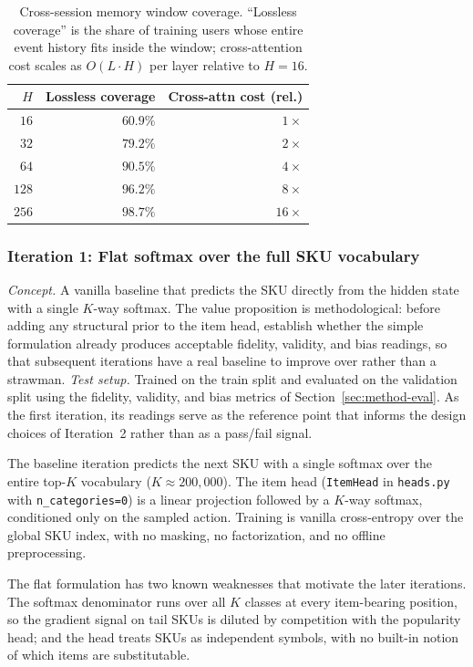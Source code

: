 \documentclass[sigconf,nonacm]{acmart}
\begin{document}
\begin{table}[t]
\caption{Cross-session memory window coverage. ``Lossless coverage''
is the share of training users whose entire event history fits inside
the window; cross-attention cost scales as $O(L \cdot H)$ per layer
relative to $H = 16$.}
\label{tab:history-window-coverage}
\small
\begin{tabular}{@{}r r r@{}}
\toprule
$H$ & Lossless coverage & Cross-attn cost (rel.) \\
\midrule
$16$  & $60.9\%$ & $1\times$  \\
$32$  & $79.2\%$ & $2\times$  \\
$64$  & $90.5\%$ & $4\times$  \\
$128$ & $96.2\%$ & $8\times$  \\
$256$ & $98.7\%$ & $16\times$ \\
\bottomrule
\end{tabular}
\end{table}

\subsubsection{Iteration 1: Flat softmax over the full SKU vocabulary}
\label{sec:iter1-flat}
\textit{Concept.} A vanilla baseline that predicts the SKU directly
from the hidden state with a single $K$-way softmax. The value
proposition is methodological: before adding any structural prior to
the item head, establish whether the simple formulation already
produces acceptable fidelity, validity, and bias readings, so that
subsequent iterations have a real baseline to improve over rather than
a strawman.
\textit{Test setup.} Trained on the train split and evaluated on the
validation split using the fidelity, validity, and bias metrics of
Section~\ref{sec:method-eval}. As the first iteration, its readings
serve as the reference point that informs the design choices of
Iteration~2 rather than as a pass/fail signal.

The baseline iteration predicts the next SKU with a single softmax over the
entire top-$K$ vocabulary ($K \approx 200{,}000$). The item head
(\texttt{ItemHead} in \texttt{heads.py} with \texttt{n\_categories=0}) is a
linear projection followed by a $K$-way softmax, conditioned only on the
sampled action. Training is vanilla cross-entropy over the global SKU
index, with no masking, no factorization, and no offline preprocessing.

The flat formulation has two known weaknesses that motivate the later
iterations. The softmax denominator runs over all $K$ classes at every
item-bearing position, so the gradient signal on tail SKUs is diluted by
competition with the popularity head; and the head treats SKUs as
independent symbols, with no built-in notion of which items are
substitutable.
\end{document}

